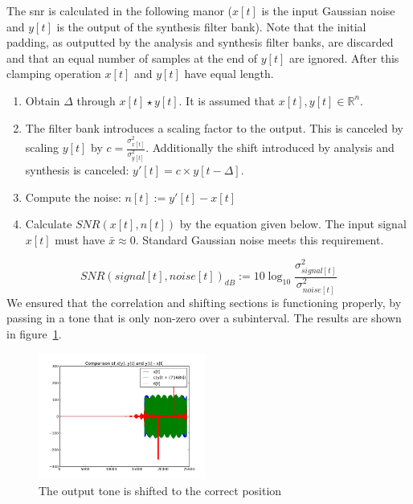 \documentclass[a4paper,10pt]{article}
\begin{document}
The \gls{snr} is calculated in the following manor ($x[t]$ is the input Gaussian noise and $y[t]$ is the output of the synthesis filter bank). Note that
the initial padding, as outputted by the analysis and synthesis filter banks, are discarded and that an equal number of samples at the end of $y[t]$ are ignored. After this
clamping operation $x[t]$ and $y[t]$ have equal length.
\begin{enumerate}
 \item Obtain $\Delta$ through $x[t]\star y[t]$. It is assumed that $x[t],y[t]\in\mathbb{R}^n$.
 \item The filter bank introduces a scaling factor to the output. This is canceled by scaling $y[t]$ by $c = \frac{\sigma_{x[t]}^2}{\sigma_{y[t]}^2}$. Additionally the shift 
 introduced by analysis and synthesis is canceled: $y'[t] = c\times y[t-\Delta]$.
 \item Compute the noise: $n[t] := y'[t]-x[t]$
 \item Calculate $SNR(x[t],n[t])$ by the equation given below. The input signal $x[t]$ must have $\bar x\approx 0$. Standard Gaussian noise meets this requirement.
\end{enumerate}
\begin{equation}
 SNR(signal[t],noise[t])_{dB}:=10\log_{10}{\frac{\sigma_{signal[t]}^2}{\sigma_{noise[t]}^2}}
\end{equation}
We ensured that the correlation and shifting sections is functioning properly, by passing in a tone that is only non-zero over a subinterval. The results are shown in figure~\ref{shift_test}.
\begin{figure}[ht!]
  \centering
  \includegraphics[width=0.49\textwidth]{shift_test.png}
  \caption[Validation of inverse shift for the calculation of the \gls{snr}]{The output tone is shifted to the correct position}
  \label{shift_test}
\end{figure}
\end{document}

